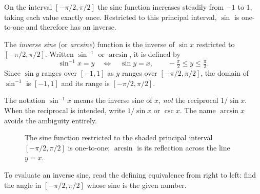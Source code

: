 On the interval \([-\pi/2, \pi/2]\) the sine function increases steadily from \(-1\) to \(1\), taking each value exactly once. Restricted to this principal interval, \(\sin\) is one-to-one and therefore has an inverse.

\begin{definition}\label{def:arcsin}
The \emph{inverse sine} (or \emph{arcsine}) function is the inverse of \(\sin x\) restricted to \([-\pi/2, \pi/2]\). Written \(\sin^{-1}\) or \(\arcsin\), it is defined by
\[
\sin^{-1} x = y \quad\Longleftrightarrow\quad \sin y = x, \qquad -\tfrac{\pi}{2} \le y \le \tfrac{\pi}{2}.
\]
Since \(\sin y\) ranges over \([-1, 1]\) as \(y\) ranges over \([-\pi/2, \pi/2]\), the domain of \(\sin^{-1}\) is \([-1, 1]\) and its range is \([-\pi/2, \pi/2]\).
\end{definition}

\begin{caution}
The notation \(\sin^{-1} x\) means the inverse sine of \(x\), \emph{not} the reciprocal \(1/\sin x\). When the reciprocal is intended, write \(1/\sin x\) or \(\csc x\). The name \(\arcsin x\) avoids the ambiguity entirely.
\end{caution}

\begin{figure}[H]
\centering
{}
\caption{The sine function restricted to the shaded principal interval \([-\pi/2, \pi/2]\) is one-to-one; \(\arcsin\) is its reflection across the line \(y = x\).}
\label{fig:inverse-sine}
\end{figure}

To evaluate an inverse sine, read the defining equivalence from right to left: find the angle in \([-\pi/2, \pi/2]\) whose sine is the given number.

